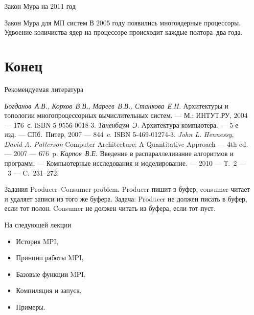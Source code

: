 \begin{frame}{Закон Мура на 2011 год}
\begin{figure}
\end{figure}
\end{frame}

\begin{frame}{Закон Мура для МП систем}
В 2005 году появились многоядерные процессоры.
\vfill
Удвоение количиства ядер на процессоре происходит каждые полтора--два года.
\end{frame}

\section*{Конец}

\begin{frame}[allowframebreaks]{Рекомендуемая литература}
\begin{thebibliography}{99}
    \bibitem{} \textit{Богданов~А.В., Корхов~В.В., Мареев~В.В., Станкова~Е.Н.}
    Архитектуры и топологии многопроцессорных вычислительных систем. --- М.:
    ИНТУТ.РУ, 2004 --- 176~с. ISBN 5-9556-0018-3.
    \bibitem{} \textit{Таненбаум~Э.} Архитектура компьютера. --- 5-е изд. ---
    СПб.~Питер, 2007 --- 844~c. ISBN 5-469-01274-3.
    \bibitem{} \textit{John L. Hennessy, David A. Patterson} Computer
    Architecture: A Quantitative Approach --- 4th ed. --- 2007 --- 676~p.
    \bibitem{} \textit{Карпов~В.Е.} Введение в распараллеливание алгоритмов и
    программ. --- Компьютерные исследования и моделирование. --- 2010 --- Т.~2
    --- \textnumero~3 --- C.~231--272.
\end{thebibliography}
\end{frame}

\begin{frame}{Задания}
Producer--Consumer problem.
\vfill
Producer пишит в буфер, consumer читает и удаляет записи из того же буфера.
\vfill
Задача: Producer не должен писать в буфер, если тот полон. Consumer не должен
читать из буфера, если тот пуст.
\end{frame}

\begin{frame}{На следующей лекции}
\begin{itemize}
    \item История MPI,
    \item Принцип работы MPI,
    \item Базовые функции MPI,
    \item Компиляция и запуск,
    \item Примеры.
\end{itemize}
\end{frame}

